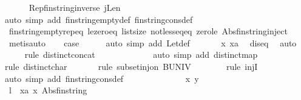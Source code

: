 \begin{isabellebody}
\ \ \ \ \isamarkupfalse%
\ Rep{\isacharunderscore}fin{\isacharunderscore}string{\isacharunderscore}inverse\ jLen\ \isamarkupfalse%
{\isacharparenleft}auto\ simp\ add{\isacharcolon}\ fin{\isacharunderscore}string{\isacharunderscore}empty{\isacharunderscore}def\ fin{\isacharunderscore}string{\isacharunderscore}cons{\isacharunderscore}def{\isacharparenright}\isanewline
\ \ \ \ \isamarkupfalse%
\ fin{\isacharunderscore}string{\isacharunderscore}empty{\isachardot}rep{\isacharunderscore}eq\ le{\isacharunderscore}zero{\isacharunderscore}eq\ list{\isachardot}size\ not{\isacharunderscore}less{\isacharunderscore}eq{\isacharunderscore}eq\ zero{\isacharunderscore}le\ Abs{\isacharunderscore}fin{\isacharunderscore}string{\isacharunderscore}inject\isanewline
\ \ \ \ \isamarkupfalse%
\ {\isacharparenleft}metis{\isacharcomma}auto{\isacharparenright}\isanewline
\ \ \isamarkupfalse%
\ {\isacharquery}case\ \isanewline
\ \ \ \ \isamarkupfalse%
{\isacharparenleft}auto\ simp\ add{\isacharcolon}\ Let{\isacharunderscore}def{\isacharparenright}\isanewline
\ \ \ \ \isamarkupfalse%
\ \ x\ xa\ \isamarkupfalse%
\ diseq\ \isamarkupfalse%
\ auto\isanewline
\ \ \ \ \isamarkupfalse%
{\isacharparenleft}rule\ distinct{\isacharunderscore}concat{\isacharparenright}\isanewline
\ \ \ \ \isamarkupfalse%
\ \isanewline
\ \ \ \ \ \ \isamarkupfalse%
{\isacharparenleft}auto\ simp\ add{\isacharcolon}\ distinct{\isacharunderscore}map{\isacharparenright}\isanewline
\ \ \ \ \ \ \ \isamarkupfalse%
{\isacharparenleft}rule\ distinct{\isacharunderscore}char{\isacharparenright}\isanewline
\ \ \ \ \ \ \isamarkupfalse%
{\isacharparenleft}rule\ subset{\isacharunderscore}inj{\isacharunderscore}on{\isacharbrackleft}\ B{\isacharequal}UNIV{\isacharbrackright}{\isacharparenright}\isanewline
\ \ \ \ \ \ \ \isamarkupfalse%
{\isacharparenleft}rule\ injI{\isacharparenright}\isanewline
\ \ \ \ \ \ \ \isamarkupfalse%
{\isacharparenleft}auto\ simp\ add{\isacharcolon}\ fin{\isacharunderscore}string{\isacharunderscore}cons{\isacharunderscore}def{\isacharparenright}\isanewline
\ \ \ \ \isamarkupfalse%
\ {\isacharminus}\isanewline
\ \ \ \ \ \ \isamarkupfalse%
\ x\ y\isanewline
\ \ \ \ \ \ \isamarkupfalse%
\ {\isacharquery}l\ {\isacharequal}\ {\isachardoublequoteopen}{\isacharparenleft}{\isasymlambda}xa\ x{\isachardot}\ Abs{\isacharunderscore}fin{\isacharunderscore}string\ \isanewline

\end{isabellebody}
